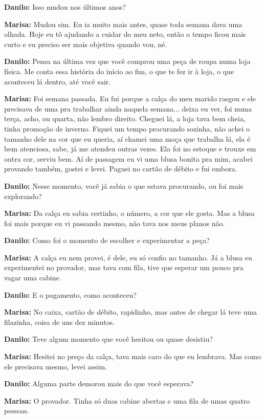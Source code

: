 \textbf{Danilo:} Isso mudou nos últimos anos?

\textbf{Marisa:} Mudou sim. Eu ia muito mais antes, quase toda semana dava uma olhada. Hoje eu tô ajudando a cuidar do meu neto, então o tempo ficou mais curto e eu preciso ser mais objetiva quando vou, né.

\textbf{Danilo:} Pensa na última vez que você comprou uma peça de roupa numa loja física. Me conta essa história do início ao fim, o que te fez ir à loja, o que aconteceu lá dentro, até você sair.

\textbf{Marisa:} Foi semana passada. Eu fui porque a calça do meu marido rasgou e ele precisava de uma pra trabalhar ainda naquela semana... deixa eu ver, foi numa terça, acho, ou quarta, não lembro direito. Cheguei lá, a loja tava bem cheia, tinha promoção de inverno. Fiquei um tempo procurando sozinha, não achei o tamanho dele na cor que eu queria, aí chamei uma moça que trabalha lá, ela é bem atenciosa, sabe, já me atendeu outras vezes. Ela foi no estoque e trouxe em outra cor, serviu bem. Aí de passagem eu vi uma blusa bonita pra mim, acabei provando também, gostei e levei. Paguei no cartão de débito e fui embora.

\textbf{Danilo:} Nesse momento, você já sabia o que estava procurando, ou foi mais explorando?

\textbf{Marisa:} Da calça eu sabia certinho, o número, a cor que ele gosta. Mas a blusa foi mais porque eu vi passando mesmo, não tava nos meus planos não.

\textbf{Danilo:} Como foi o momento de escolher e experimentar a peça?

\textbf{Marisa:} A calça eu nem provei, é dele, eu só confio no tamanho. Já a blusa eu experimentei no provador, mas tava com fila, tive que esperar um pouco pra vagar uma cabine.

\textbf{Danilo:} E o pagamento, como aconteceu?

\textbf{Marisa:} No caixa, cartão de débito, rapidinho, mas antes de chegar lá teve uma filazinha, coisa de uns dez minutos.

\textbf{Danilo:} Teve algum momento que você hesitou ou quase desistiu?

\textbf{Marisa:} Hesitei no preço da calça, tava mais caro do que eu lembrava. Mas como ele precisava mesmo, levei assim.

\textbf{Danilo:} Alguma parte demorou mais do que você esperava?

\textbf{Marisa:} O provador. Tinha só duas cabine abertas e uma fila de umas quatro pessoas.

